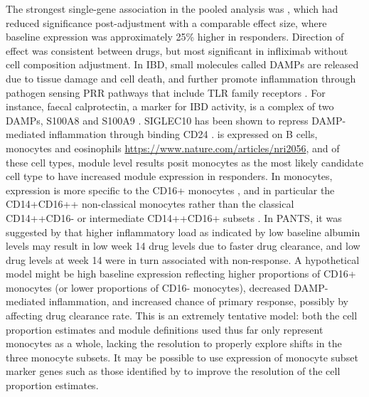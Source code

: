 The strongest single-gene association in the pooled analysis was , 
which had reduced significance post-adjustment with a comparable effect size,
where baseline expression was approximately 25\% higher in responders.
Direction of effect was consistent between drugs, but most significant in infliximab without cell composition adjustment.
In \gls{IBD}, small molecules called \glspl{DAMP} are released due to tissue damage and cell death, 
and further promote inflammation through pathogen sensing \gls{PRR} pathways that include \gls{TLR} family receptors \autocite{boyapati2016GutMucosalDAMPs,desouza2016ImmunopathogenesisIBDCurrent}.
For instance, faecal calprotectin, a marker for \gls{IBD} activity, is a complex of two \glspl{DAMP}, S100A8 and S100A9 \autocite{desouza2016ImmunopathogenesisIBDCurrent}.
SIGLEC10 has been shown to repress \gls{DAMP}-mediated inflammation through binding CD24 \autocite{boyapati2016GutMucosalDAMPs}.
 is expressed on B cells, monocytes and eosinophils \url{https://www.nature.com/articles/nri2056},
and of these cell types, module level results posit monocytes as the most likely candidate cell type to have increased module expression in responders.
In monocytes,  expression is more specific to the CD16+ monocytes \autocite{martinez2009TranscriptomeHumanMonocyte},
and in particular the CD14+CD16++ non-classical monocytes rather than the classical CD14++CD16- or intermediate CD14++CD16+ subsets \autocite{villani2017SinglecellRNAseqReveals}.
In \gls{PANTS}, it was suggested by \textcite{kennedy2019PredictorsAntiTNFTreatment} that higher inflammatory load as indicated by low baseline albumin levels 
may result in low week 14 drug levels due to faster drug clearance,
and low drug levels at week 14 were in turn associated with non-response.
A hypothetical model might be high baseline  expression reflecting 
higher proportions of CD16+ monocytes (or lower proportions of CD16- monocytes),
decreased \gls{DAMP}-mediated inflammation, 
and increased chance of primary response, possibly by affecting drug clearance rate.
This is an extremely tentative model:
both the cell proportion estimates and module definitions used thus far only represent monocytes as a whole,
lacking the resolution to properly explore shifts in the three monocyte subsets.
It may be possible to use expression of monocyte subset marker genes such as those identified by \textcite{villani2017SinglecellRNAseqReveals} to improve the resolution of the cell proportion estimates.

